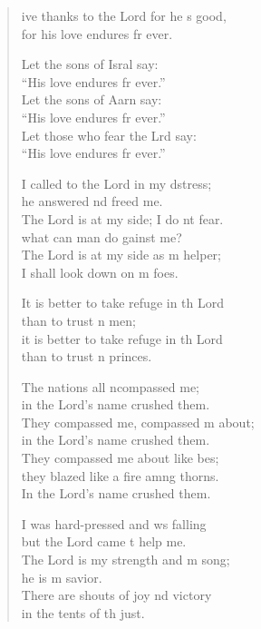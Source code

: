 \settowidth{\versewidth}{I shall not die, I shall live and recount his deeds.}
\begin{verse}%
  \begin{patverse}
    ive thanks to the Lord for he \pointup{\i}s good,\Med\\
    for his love endures fr ever.

    Let the sons of Isral say:\Med\\
    “His love endures fr ever.”\\
    Let the sons of Aarn say:\Med\\
    “His love endures fr ever.”\\
    Let those who fear the Lrd say:\Med\\
    “His love endures fr ever.”

    I called to the Lord in my d\pointup{\i}stress;\Med\\
    he answered nd freed me.\\
    The Lord is at my side; I do nt fear.\Med\\
    what can man do gainst me?\\
    The Lord is at my side as m helper;\Med\\
    I shall look down on m foes.

    It is better to take refuge in th Lord\Med\\
    than to trust \pointup{\i}n men;\\
    it is better to take refuge in th Lord\Med\\
    than to trust \pointup{\i}n princes.

    The nations all ncompassed me;\Med\\
    in the Lord’s name  crushed them.\\
    They compassed me, compassed m about;\Med\\
    in the Lord’s name  crushed them.\\
    They compassed me about like bes;\Flex\\
    they blazed like a fire amng thorns.\Med\\
    In the Lord’s name  crushed them.

    I was hard-pressed and ws falling\Med\\
    but the Lord came t help me.\\
    The Lord is my strength and m song;\Med\\
    he is m savior.\\
    There are shouts of joy nd victory\Med\\
    in the tents of th just.


\end{patverse}
\end{verse}
